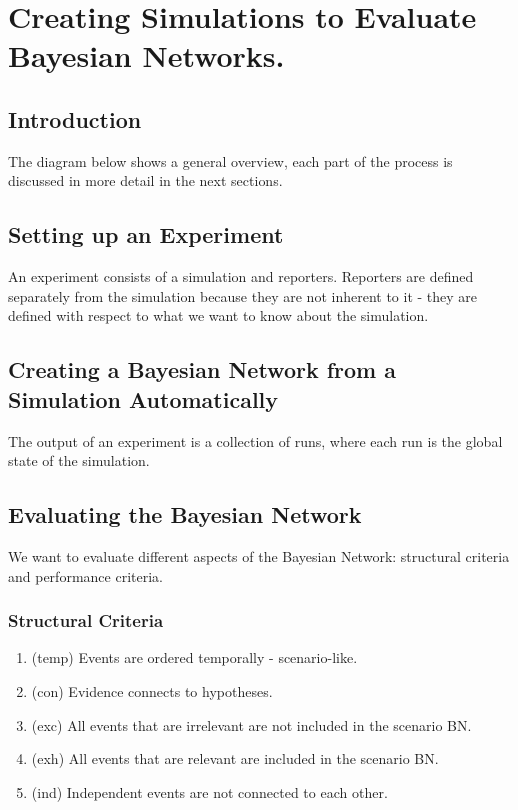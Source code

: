  

\chapter[Method: Simulations to Evaluate Bayesian Networks]{Creating Simulations to Evaluate Bayesian Networks.}

\section{Introduction}

The diagram below shows a general overview, each part of the process is discussed in more detail in the next sections.


\section{Setting up an Experiment}
An experiment consists of a simulation and reporters. Reporters are defined separately from the simulation because they are not inherent to it - they are defined with respect to what we want to know about the simulation.

\section{Creating a Bayesian Network from a Simulation Automatically}
The output of an experiment is a collection of runs, where each run is the global state of the simulation.

\section{Evaluating the Bayesian Network}

We want to evaluate different aspects of the Bayesian Network: structural criteria and performance criteria.

\subsection{Structural Criteria}
\begin{enumerate}
\item (temp) Events are ordered temporally - scenario-like.
\item (con) Evidence connects to hypotheses.
\item (exc) All events that are irrelevant are not included in the scenario BN.
\item (exh) All events that are relevant are included in the scenario BN.
\item (ind) Independent events are not connected to each other.
\end{enumerate}

